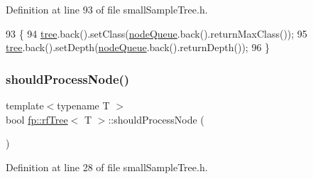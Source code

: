 Definition at line 93 of file small\+Sample\+Tree.\+h.


\begin{DoxyCode}
93                                        \{
94                     \hyperlink{classtree}{tree}.back().setClass(\hyperlink{classfp_1_1rfTree_af72d0a2f930fd480dfb4858885c2df23}{nodeQueue}.back().returnMaxClass());
95                     \hyperlink{classtree}{tree}.back().setDepth(\hyperlink{classfp_1_1rfTree_af72d0a2f930fd480dfb4858885c2df23}{nodeQueue}.back().returnDepth());
96                 \}
\end{DoxyCode}
\mbox{\label{classfp_1_1rfTree_a36abf82d31ca57670b09da16525dce0d}} 
\subsubsection{\texorpdfstring{should\+Process\+Node()}{shouldProcessNode()}\hspace{0.1cm}{\footnotesize\ttfamily [1/2]}}
{\footnotesize\ttfamily template$<$typename T $>$ \\
bool \hyperlink{classfp_1_1rfTree}{fp\+::rf\+Tree}$<$ T $>$\+::should\+Process\+Node (\begin{DoxyParamCaption}{ }\end{DoxyParamCaption})\hspace{0.3cm}{\ttfamily [inline]}}



Definition at line 28 of file small\+Sample\+Tree.\+h.


